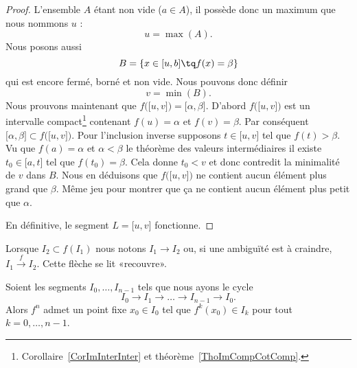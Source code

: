 \begin{proof}
    L'ensemble \( A\) étant non vide (\( a\in A\)), il possède donc un maximum que nous nommons \( u\) :
    \begin{equation}
        u=\max(A).
    \end{equation}
    Nous posons aussi
    \begin{equation}
        B=\{ x\in \mathopen[ u , b \mathclose]\tq f(x)=\beta \}
    \end{equation}
    qui est encore fermé, borné et non vide. Nous pouvons donc définir
    \begin{equation}
        v=\min(B).
    \end{equation}
    Nous prouvons maintenant que \( f\big( \mathopen[ u , v \mathclose] \big)=\mathopen[ \alpha , \beta \mathclose]\). D'abord \( f\big( \mathopen[ u , v \mathclose] \big)\) est un intervalle compact\footnote{Corollaire~\ref{CorImInterInter} et théorème~\ref{ThoImCompCotComp}.} contenant \( f(u)=\alpha\) et \( f(v)=\beta\). Par conséquent \( \mathopen[ \alpha , \beta \mathclose]\subset f\big( \mathopen[ u , v \mathclose] \big)\). Pour l'inclusion inverse supposons \( t\in \mathopen[ u , v \mathclose]\) tel que \( f(t)>\beta\). Vu que \( f(a)=\alpha\) et \( \alpha<\beta\) le théorème des valeurs intermédiaires il existe \( t_0\in \mathopen[ a , t \mathclose]\) tel que \( f(t_0)=\beta\). Cela donne \( t_0<v\) et donc contredit la minimalité de \( v\) dans \( B\). Nous en déduisons que \( f\big( \mathopen[ u , v \mathclose] \big)\) ne contient aucun élément plus grand que \( \beta\). Même jeu pour montrer que ça ne contient aucun élément plus petit que \( \alpha\).

    En définitive, le segment \( L=\mathopen[ u , v \mathclose]\) fonctionne.
\end{proof}

Lorsque \( I_2\subset f(I_1)\) nous notons \( I_1\to I_2\) ou, si une ambiguïté est à craindre, \( I_1\stackrel{f}{\longrightarrow}I_2\). Cette flèche se lit «recouvre».
\begin{lemma}      \label{LemSSPXooMkwzjb}
    Soient les segments \( I_0,\ldots, I_{n-1}\) tels que nous ayons le cycle
    \begin{equation}
        I_0\to I_1\to\ldots\to I_{n-1}\to I_0.
    \end{equation}
    Alors \( f^n\) admet un point fixe \( x_0\in I_0\) tel que \( f^k(x_0)\in I_k\) pour tout \( k=0,\ldots, n-1\).
\end{lemma}

